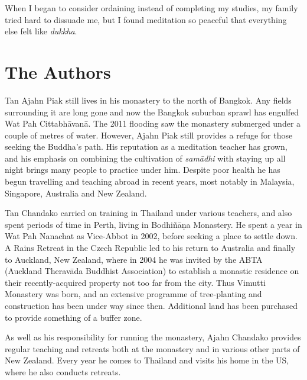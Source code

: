 When I began to consider ordaining instead of completing my studies, my
family tried hard to dissuade me, but I found meditation so peaceful
that everything else felt like \emph{dukkha}. 

\dividerRule

\section{The Authors}

Tan Ajahn Piak still lives in his monastery to the north of
Bangkok. Any fields surrounding it are long gone and now the Bangkok
suburban sprawl has engulfed Wat Pah Cittabhāvanā. The 2011 flooding saw
the monastery submerged under a couple of metres of water. However, 
Ajahn Piak still provides a refuge for those seeking the Buddha's path. 
His reputation as a meditation teacher has grown, and his emphasis on
combining the cultivation of \emph{samādhi} with staying up all night brings
many people to practice under him. Despite poor health he has begun
travelling and teaching abroad in recent years, most notably in
Malaysia, Singapore, Australia and New Zealand.

Tan Chandako carried on training in Thailand under various
teachers, and also spent periods of time in Perth, living in Bodhiñāṇa
Monastery. He spent a year in Wat Pah Nanachat as Vice-Abbot in 2002, 
before seeking a place to settle down. A Rains Retreat in the Czech
Republic led to his return to Australia and finally to Auckland, New
Zealand, where in 2004 he was invited by the ABTA (Auckland Theravāda 
Buddhist Association) to establish a monastic residence on their
recently-acquired property not too far from the city. Thus Vimutti
Monastery was born, and an extensive programme of tree-planting and
construction has been under way since then. Additional land has been
purchased to provide something of a buffer zone.

As well as his responsibility for running the monastery, Ajahn Chandako
provides regular teaching and retreats both at the monastery and in
various other parts of New Zealand. Every year he comes to Thailand and
visits his home in the US, where he also conducts retreats. 

